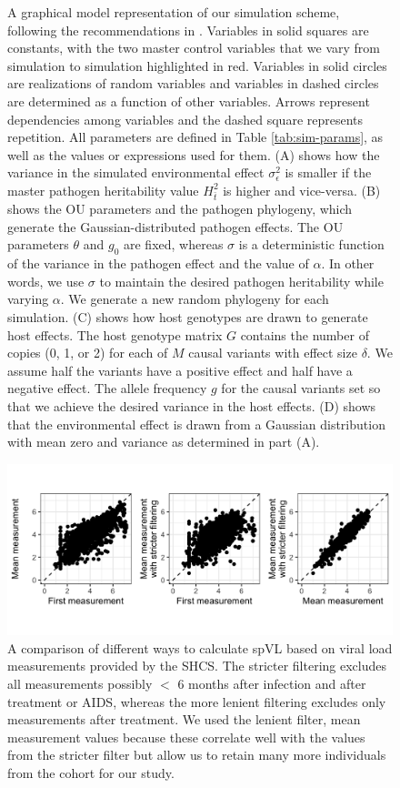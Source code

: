 \documentclass[11pt]{article}
\begin{document}
\begin{doublespace}
\begin{figure}[H]
\begin{tikzpicture}
	\end{tikzpicture}
	\caption{A graphical model representation of our simulation scheme, following the recommendations in \cite{Hohna2014}. Variables in solid squares are constants, with the two master control variables that we vary from simulation to simulation highlighted in red. Variables in solid circles are realizations of random variables and variables in dashed circles are determined as a function of other variables. Arrows represent dependencies among variables and the dashed square represents repetition. All parameters are defined in Table \ref{tab:sim-params}, as well as the values or expressions used for them. (A) shows how the variance in the simulated environmental effect $\sigma^2_{\epsilon}$ is smaller if the master pathogen heritability value $H^2_{\bar{t}}$ is higher and vice-versa. (B) shows the OU parameters and the pathogen phylogeny, which generate the Gaussian-distributed pathogen effects. The OU parameters $\theta$ and $g_0$ are fixed, whereas $\sigma$ is a deterministic function of the variance in the pathogen effect and the value of $\alpha$. In other words, we use $\sigma$ to maintain the desired pathogen heritability while varying $\alpha$. We generate a new random phylogeny for each simulation. (C) shows how host genotypes are drawn to generate host effects. The host genotype matrix $G$ contains the number of copies (0, 1, or 2) for each of $M$ causal variants with effect size $\delta$. We assume half the variants have a positive effect and half have a negative effect. The allele frequency $g$ for the causal variants set so that we achieve the desired variance in the host effects. (D) shows that the environmental effect is drawn from a Gaussian distribution with mean zero and variance as determined in part (A).}
	\label{fig:sim-design}
\end{figure}

\begin{figure}[H]
\begin{center}
\includegraphics[width = 0.7\linewidth]{figures/spvl_calculation_comparison.png}
	\caption{A comparison of different ways to calculate spVL based on viral load measurements provided by the SHCS. The stricter filtering excludes all measurements possibly $<$ 6 months after infection and after treatment or AIDS, whereas the more lenient filtering excludes only measurements after treatment. We used the lenient filter, mean measurement values because these correlate well with the values from the stricter filter but allow us to retain many more individuals from the cohort for our study.}
	\label{fig:spvl-calc-comparison}
	\end{center}
\end{figure}


\end{doublespace}
\end{document}
